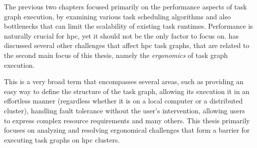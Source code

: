 The previous two chapters focused primarily on the performance aspects of task graph execution, by
examining various task scheduling algorithms and also bottlenecks that can limit the scalability of
existing task runtimes. Performance is naturally crucial for \gls{hpc}, yet it should
not be the only factor to focus on.  has discussed several other challenges
that affect \gls{hpc} task graphs, that are related to the second main focus of this
thesis, namely the \emph{ergonomics} of task graph execution.

This is a very broad term that encompasses several areas, such as providing an easy way to define
the structure of the task graph, allowing its execution it in an effortless manner (regardless
whether it is on a local computer or a distributed cluster), handling fault tolerance without the
user's intervention, allowing users to express complex resource requirements and many others. This
thesis primarily focuses on analyzing and resolving ergonomical challenges that form a barrier for
executing task graphs on \gls{hpc} clusters.






